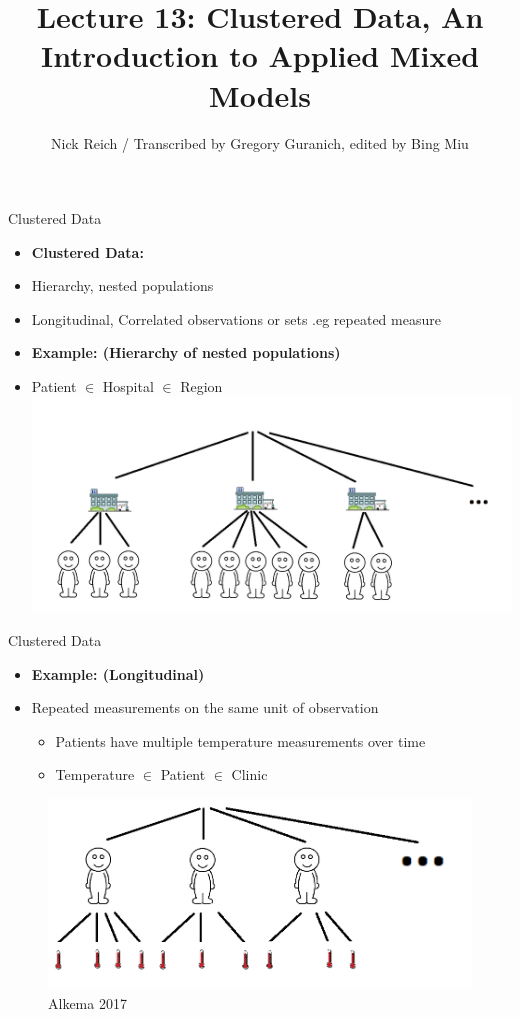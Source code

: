\documentclass[ignorenonframetext,]{beamer}
\title{Lecture 13: Clustered Data, An Introduction to Applied Mixed Models}
\author{Nick Reich / Transcribed by Gregory Guranich, edited by Bing Miu}
\date{}
\providecommand{\tightlist}{%
  \setlength{\itemsep}{0pt}\setlength{\parskip}{0pt}}
\begin{document}
\frame{\titlepage}

\begin{frame}{Clustered Data}

\begin{itemize}
\tightlist
\item
  \textbf{Clustered Data:}\\
\item
  Hierarchy, nested populations\\
\item
  Longitudinal, Correlated observations or sets .eg repeated measure
\item
  \textbf{Example: (Hierarchy of nested populations)}\\
\item
  Patient \(\in\) Hospital \(\in\) Region \includegraphics{img1.png}
\end{itemize}

\end{frame}

\begin{frame}{Clustered Data}

\begin{itemize}
\tightlist
\item
  \textbf{Example: (Longitudinal)}
\item
  Repeated measurements on the same unit of observation

  \begin{itemize}
  \tiny
  \item Patients have multiple temperature measurements over time
  \item Temperature $\in$ Patient $\in$ Clinic
  \end{itemize}
\end{itemize}

\begin{figure}
\centering
\includegraphics{img2.png}
\caption{Alkema 2017}
\end{figure}

\end{frame}
\end{document}
